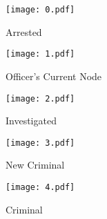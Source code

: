 \documentclass[11pt]{article}
\begin{document}
\begin{figure}\centering \begin{subfigure}[t]{.12\textwidth}\centering\begin{LARGE}
\texttt{[image: 0.pdf]}
\caption{Arrested}\end{LARGE}\end{subfigure}
\quad\quad\quad
 \begin{subfigure}[t]{.12\textwidth}\centering\begin{LARGE}
\texttt{[image: 1.pdf]}
\caption{Officer's Current Node}\end{LARGE}\end{subfigure}
\quad\quad\quad
 \begin{subfigure}[t]{.12\textwidth}\centering\begin{LARGE}
\texttt{[image: 2.pdf]}
\caption{Investigated}\end{LARGE}\end{subfigure}
\quad\quad\quad
 \begin{subfigure}[t]{.12\textwidth}\centering\begin{LARGE}
\texttt{[image: 3.pdf]}
\caption{New Criminal}\end{LARGE}\end{subfigure}
\quad\quad\quad
 \begin{subfigure}[t]{.12\textwidth}\centering\begin{LARGE}
\texttt{[image: 4.pdf]}
\caption{Criminal}\end{LARGE}\end{subfigure}
\caption{}
\end{figure}
\end{document}

